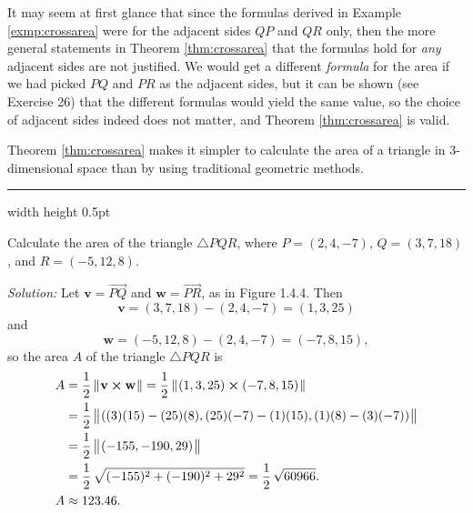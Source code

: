 It may seem at first glance that since the formulas derived in Example \ref{exmp:crossarea} were for the adjacent
sides $QP$ and $QR$ only, then the more general statements in Theorem \ref{thm:crossarea} that the formulas hold for
\emph{any} adjacent sides are not justified. We would get a different \emph{formula} for the area if we had
picked $PQ$ and $PR$ as the adjacent sides, but it can be shown (see Exercise 26) that the different formulas would
yield the same value, so the choice of adjacent sides indeed does not matter, and
Theorem \ref{thm:crossarea} is valid.

Theorem \ref{thm:crossarea} makes it simpler to calculate the area of a triangle in 3-dimensional space than by using
traditional geometric methods.

\medskip
\hrule width \textwidth height 0.5pt
\begin{exmp}
 Calculate the area of the triangle $\triangle PQR$, where $P = (2,4,-7)$, $Q = (3,7,18)$, and
 $R =(-5,12,8)$.\smallskip
 \piccaption[]{}
 \par\noindent\emph{Solution:} Let $\mathbf{v} = \overrightarrow{PQ}$ and $\mathbf{w} = \overrightarrow{PR}$, as in
 Figure 1.4.4. 
 Then 
 \[\mathbf{v} = (3,7,18) - (2,4,-7) = (1,3,25)\] 
 and 
 \[\mathbf{w} = (-5,12,8) - (2,4,-7) = (-7,8,15),\]
 so the area $A$ of the triangle $\triangle PQR$ is
 \begin{align*}
 A &= \frac{1}{2}\,\lVert\mspace{1mu}\mathbf{v} \bm{\times} \mathbf{w}\mspace{1mu}\rVert = \frac{1}{2}\,\lVert\mspace{1mu}(1,3,25) \bm{\times} (-7,8,15)\mspace{1mu}\rVert\\
 &= \frac{1}{2}\,\bigl\lVert\mspace{1mu}((3)(15) - (25)(8), (25)(-7) - (1)(15), (1)(8) - (3)(-7))\mspace{1mu}\bigr\rVert\\
 &= \frac{1}{2}\,\bigl\lVert\mspace{1mu}(-155, -190, 29)\mspace{1mu}\bigr\rVert\\
 &= \frac{1}{2}\,\sqrt{(-155)^2 + (-190)^2 + 29^2} = \frac{1}{2}\,\sqrt{60966}.\\
 A &\approx 123.46.
 \end{align*}
 \end{exmp}
